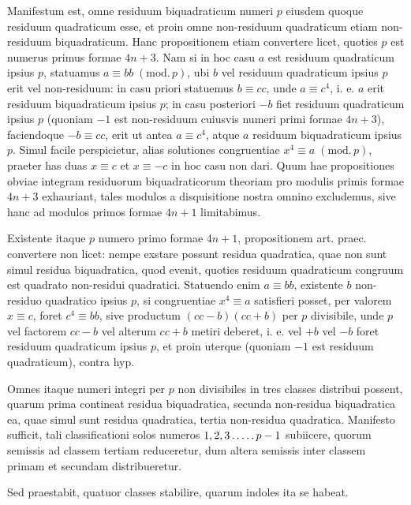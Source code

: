 Manifestum est, omne residuum biquadraticum numeri $p$ eiusdem quoque residuum quadraticum esse, et proin omne non-residuum quadraticum etiam non-residuum biquadraticum. Hanc propositionem etiam convertere licet, quoties $p$ est numerus primus formae $4n+3$. Nam si in hoc casu $a$ est residuum quadraticum ipsius $p$, statuamus $a\equiv bb\; (\mathrm{mod.}\,p)$, ubi $b$ vel residuum quadraticum ipsius $p$ erit vel non-residuum: in casu priori statuemus $b\equiv cc$, unde $a\equiv c^4$, i. e. $a$ erit residuum biquadraticum ipsius $p$; in casu posteriori $-b$ fiet residuum quadraticum ipsius $p$ (quoniam $-1$ est non-residuum cuiusvis numeri primi formae $4n+3$), faciendoque $-b\equiv cc$, erit ut antea $a\equiv c^4$, atque $a$ residuum biquadraticum ipsius $p$. Simul facile perspicietur, alias solutiones congruentiae $x^4\equiv a\; (\mathrm{mod.}\,p)$, praeter has duas $x\equiv c$ et $x\equiv-c$ in hoc casu non dari. Quum hae propositiones obviae integram residuorum biquadraticorum theoriam pro modulis primis formae $4n+3$ exhauriant, tales modulos a disquisitione nostra omnino excludemus, sive hanc ad modulos primos formae $4n+1$ limitabimus.

Existente itaque $p$ numero primo formae $4n+1$, propositionem art. praec. convertere non licet: nempe exstare possunt residua quadratica, quae non sunt simul residua biquadratica, quod evenit, quoties residuum quadraticum congruum est quadrato non-residui quadratici. Statuendo enim $a\equiv bb$, existente $b$ non-%
%
residuo quadratico ipsius $p$, si congruentiae $x^4\equiv a$ satisfieri posset, per valorem $x\equiv c$, foret $c^4\equiv bb$, sive productum $(cc-b)(cc+b)$ per $p$ divisibile, unde $p$ vel factorem $cc-b$ vel alterum $cc+b$ metiri deberet, i. e. vel $+b$ vel $-b$ foret residuum quadraticum ipsius $p$, et proin uterque (quoniam $-1$ est residuum quadraticum), contra hyp.

Omnes itaque numeri integri per $p$ non divisibiles in tres classes distribui possent, quarum prima contineat residua biquadratica, secunda non-residua biquadratica ea, quae simul sunt residua quadratica, tertia non-residua quadratica. Manifesto sufficit, tali classificationi solos numeros $1,2,3\mathinner{.\,.\,.\,.\,.} p-1$ subiicere, quorum semissis ad classem tertiam reduceretur, dum altera semissis inter classem primam et secundam distribueretur.

Sed praestabit, quatuor classes stabilire, quarum indoles ita se habeat.

